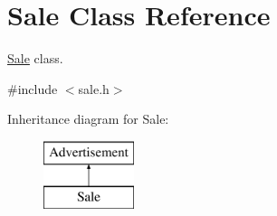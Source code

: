 \hypertarget{class_sale}{}\section{Sale Class Reference}
\label{class_sale}


\hyperlink{class_sale}{Sale} class.  




{\ttfamily \#include $<$sale.\+h$>$}

Inheritance diagram for Sale\+:\begin{figure}[H]
\begin{center}
\leavevmode
\includegraphics[height=2.000000cm]{class_sale}
\end{center}
\end{figure}
